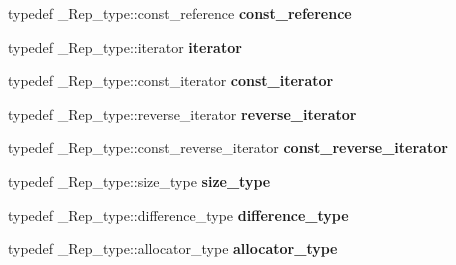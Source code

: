 \begin{DoxyCompactItemize}
typedef \+\_\+\+Rep\+\_\+type\+::const\+\_\+reference {\bfseries const\+\_\+reference}
\item 
\mbox{\label{classmultimap_a74a739f7267b6d2a65300c642bf072c2}} 
typedef \+\_\+\+Rep\+\_\+type\+::iterator {\bfseries iterator}
\item 
\mbox{\label{classmultimap_a18029c7e680d1cdaf1be5b7c7b85ad2d}} 
typedef \+\_\+\+Rep\+\_\+type\+::const\+\_\+iterator {\bfseries const\+\_\+iterator}
\item 
\mbox{\label{classmultimap_accaf6a47a6f9e84aa8b9c952117aa03e}} 
typedef \+\_\+\+Rep\+\_\+type\+::reverse\+\_\+iterator {\bfseries reverse\+\_\+iterator}
\item 
\mbox{\label{classmultimap_a830fc4045b97d4f06b57406246920f46}} 
typedef \+\_\+\+Rep\+\_\+type\+::const\+\_\+reverse\+\_\+iterator {\bfseries const\+\_\+reverse\+\_\+iterator}
\item 
\mbox{\label{classmultimap_a2dfc80a743283765f2e9037b9c0fdd58}} 
typedef \+\_\+\+Rep\+\_\+type\+::size\+\_\+type {\bfseries size\+\_\+type}
\item 
\mbox{\label{classmultimap_a0b3d06832f92fc3eb57b3adbda78a01f}} 
typedef \+\_\+\+Rep\+\_\+type\+::difference\+\_\+type {\bfseries difference\+\_\+type}
\item 
\mbox{\label{classmultimap_a5c819df5f8e43d6c2cfdfacb29c687ba}} 
typedef \+\_\+\+Rep\+\_\+type\+::allocator\+\_\+type {\bfseries allocator\+\_\+type}
\end{DoxyCompactItemize}
